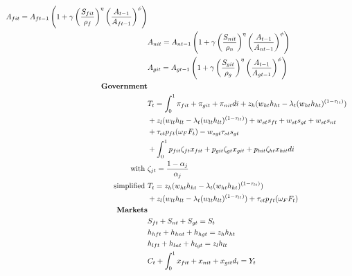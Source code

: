 \begin{align}
A_{fit}=A_{ft-1}\left(1+\gamma\left(\frac{S_{fit}}{\rho_f}\right)^{\eta}\left(\frac{A_{t-1}}{A_{ft-1}}\right)^{\phi}\right) \\
&
A_{nit}=A_{nt-1}\left(1+\gamma\left(\frac{S_{nit}}{\rho_n}\right)^{\eta}\left(\frac{A_{t-1}}{A_{nt-1}}\right)^{\phi}\right) \\
&
A_{git}=A_{gt-1}\left(1+\gamma\left(\frac{S_{git}}{\rho_g}\right)^{\eta}\left(\frac{A_{t-1}}{A_{gt-1}}\right)^{\phi}\right) \\
\text{\textbf{Government}}&\\
&T_t=\int_{0}^{1}\pi_{fit}+\pi_{git}+\pi_{nit}di+z_h(w_{ht}h_{ht}-\lambda_t(w_{ht}h_{ht})^{(1-\tau_{lt})})\\&+z_l(w_{lt}h_{lt}-\lambda_t(w_{lt}h_{lt})^{(1-\tau_{lt})})+w_{st}s_{ft}+w_{st}s_{gt}+w_{st}s_{nt}\\ &+\tau_{ct}p_{ft}(\omega_FF_t)-w_{sgt}\tau_{st}s_{gt} \\ &+\int_{0}^{1} p_{fit}\zeta_{ft}x_{fit}+p_{git}\zeta_{gt}x_{git}+ p_{hit}\zeta_{ht}x_{hit}di\\
\text{with}\ \vspace{4mm}&\zeta_{jt}=\frac{1-\alpha_j}{\alpha_j} \\
\text{simplified}\ \vspace{4mm} & T_t= z_h(w_{ht}h_{ht}-\lambda_t(w_{ht}h_{ht})^{(1-\tau_{lt})})\\&+z_l(w_{lt}h_{lt}-\lambda_t(w_{lt}h_{lt})^{(1-\tau_{lt})})+\tau_{ct}p_{ft}(\omega_FF_t) \\
\text{\textbf{Markets}}&\\
& S_{ft}+ S_{nt}+ S_{gt}=S_t\\
&h_{hft}+h_{hnt}+h_{hgt}=z_{h} h_{ht}\\
&h_{lft}+h_{lnt}+h_{lgt}=z_{l} h_{lt}\\
&C_{t}+\int_{0}^{1} x_{fit}+x_{nit}+x_{git}d_i=Y_t
\end{align}

